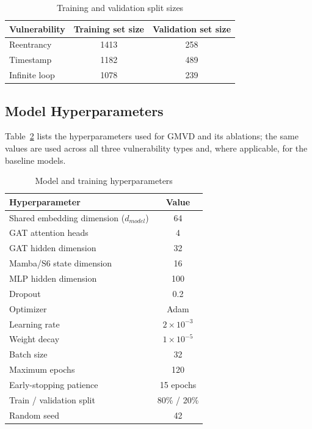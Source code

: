 \documentclass[12pt, a4paper, openright, twoside]{report}
\begin{document}
\begin{table}[htbp]
\centering
\caption{Training and validation split sizes}
\label{tab:split_sizes}
\begin{tabular}{|l|c|c|}
\hline
\textbf{Vulnerability} & \textbf{Training set size} & \textbf{Validation set size} \\ \hline
Reentrancy & 1413 & 258 \\ \hline
Timestamp  & 1182 & 489 \\ \hline
Infinite loop & 1078 & 239 \\ \hline
\end{tabular}
\end{table}

\subsection{Model Hyperparameters}

Table~\ref{tab:hyperparams} lists the hyperparameters used for GMVD and its ablations; the same values are used across all three vulnerability types and, where applicable, for the baseline models.

\begin{table}[htbp]
\centering
\caption{Model and training hyperparameters}
\label{tab:hyperparams}
\begin{tabular}{|l|c|}
\hline
\textbf{Hyperparameter} & \textbf{Value} \\ \hline
Shared embedding dimension ($d_{model}$) & 64 \\ \hline
GAT attention heads & 4 \\ \hline
GAT hidden dimension & 32 \\ \hline
Mamba/S6 state dimension & 16 \\ \hline
MLP hidden dimension & 100 \\ \hline
Dropout & 0.2 \\ \hline
Optimizer & Adam \\ \hline
Learning rate & $2\times10^{-3}$ \\ \hline
Weight decay & $1\times10^{-5}$ \\ \hline
Batch size & 32 \\ \hline
Maximum epochs & 120 \\ \hline
Early-stopping patience & 15 epochs \\ \hline
Train / validation split & 80\% / 20\% \\ \hline
Random seed & 42 \\ \hline
\end{tabular}
\end{table}
\end{document}
